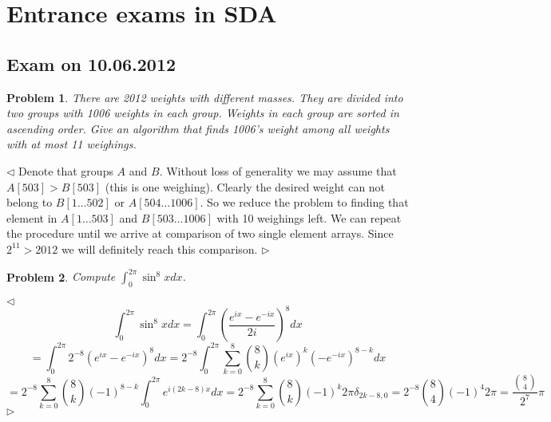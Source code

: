 \documentclass[12pt]{article}
\newtheorem{problem}{Problem}[subsection]
\newenvironment{solution}{\par $\triangleleft$}{$\triangleright$}
\begin{document}
\newpage

\section{Entrance exams in SDA}

\subsection{Exam on 10.06.2012}

\begin{problem} There are 2012 weights with different masses. They are divided
into two groups with 1006 weights in each group. Weights in each group are
sorted in ascending order. Give an algorithm that finds 1006's weight among all
weights with at most 11 weighings.
\end{problem}
\begin{solution} Denote that groups $A$ and $B$. Without loss of generality we
    may assume that $A[503]>B[503]$ (this is one weighing). Clearly the desired
    weight can not belong to $B[1\ldots 502]$ or $A[504\ldots 1006]$. So we
    reduce the problem to finding that element in $A[1\ldots 503]$ and
    $B[503\ldots 1006]$ with 10 weighings left. We can repeat the procedure
    until we arrive at comparison of two single element arrays. Since
    $2^{11}>2012$ we will definitely reach this comparison.
\end{solution}

\begin{problem} Compute $\int_{0}^{2\pi} \sin ^8xdx$.
\end{problem}
\begin{solution}
    $$
        \int_0^{2\pi}\sin^8xdx
        =\int_0^{2\pi}{\left(\frac{e^{ix}-e^{-ix}}{2i}\right)}^8dx
    $$
    $$
        =\int_0^{2\pi}2^{-8}{(e^{ix}-e^{-ix})}^8dx
        =2^{-8}\int_0^{2\pi}\sum_{k=0}^8
        \binom{8}{k}{(e^{ix})}^k{(-e^{-ix})}^{8-k}dx
    $$
    $$
        =2^{-8}\sum_{k=0}^8\binom{8}{k}{(-1)}^{8-k}\int_0^{2\pi}e^{i(2k-8)x}dx
        =2^{-8}\sum_{k=0}^8\binom{8}{k}{(-1)}^{k}2\pi\delta_{2k-8,0}
        =2^{-8}\binom{8}{4}{(-1)}^{4}2\pi
        =\frac{\binom{8}{4}}{2^7}\pi
    $$
\end{solution}
\end{document}
